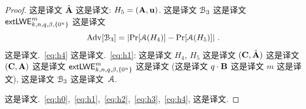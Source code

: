 \begin{proof}
这是译文 $\hat{\mathbf{{A}}}$ 这是译文: $H_5 = (\mathbf{{A}}, \mathbf{{u}})$. 这是译文 ${\cal B}_3$ 这是译文 $\mathsf{extLWE}^m_{k,n,q,\beta,\{0^n\}}$ 这是译文 \begin{equation}\label{eq:h4}
\mathrm{Adv}[{\cal B}_3] = \lvert\Pr[{\cal A}(H_4)]- \Pr[{\cal A}(H_5)]\rvert~.
\end{equation} 这是译文.~\eqref{eq:h4} 这是译文.~\eqref{eq:h1}: 这是译文 $H_4$, $H_5$ 这是译文 $(\mathbf{{C}}, \hat{\mathbf{{A}}})$ 这是译文 $(\mathbf{{C}}, \mathbf{{A}})$ 这是译文 $\mathsf{extLWE}^m_{k,n,q,\beta,\{0^n\}}$ 这是译文 (这是译文 $q\cdot\mathbf{{B}}$ 这是译文 $m$ 这是译文), 这是译文 ${\cal B}_3$ 这是译文~${\cal A}$.

这是译文.~\eqref{eq:h0},~\eqref{eq:h1},~\eqref{eq:h2},~\eqref{eq:h3},~\eqref{eq:h4}, 这是译文.
\end{proof}












